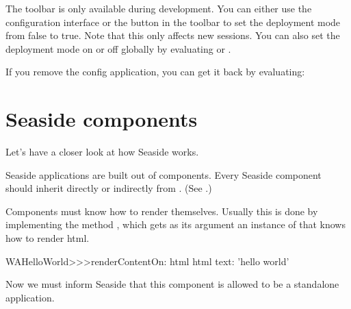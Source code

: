 \documentclass[a4paper,10pt,twoside]{book}
\begin{document}

The toolbar is only available during development.
You can either use the configuration interface or the  button in the toolbar to set the deployment mode from false to true.
Note that this only affects new sessions.
You can also set the deployment mode on or off globally by evaluating
or
.

If you remove the config application, you can get it back by evaluating:

\section{Seaside components}

Let's have a closer look at how Seaside works.

Seaside applications are built out of components.
Every Seaside component should inherit directly or indirectly from . (See .)


Components must know how to render themselves.
Usually this is done by implementing the method , which gets as its argument an instance of  that knows how to render html.

\begin{code}{}
WAHelloWorld>>>renderContentOn: html
	html text: 'hello world'
\end{code}

Now we must inform Seaside that this component is allowed to be a standalone application.

\end{document}
